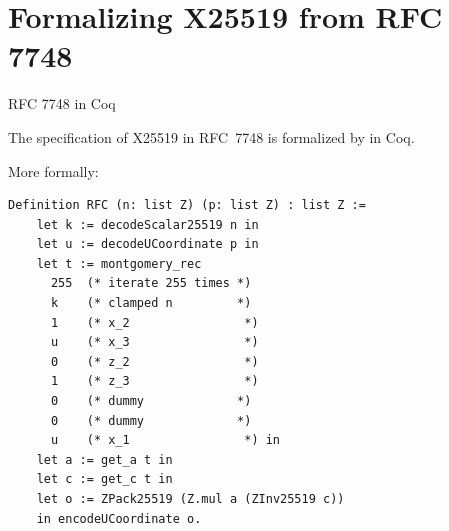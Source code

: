 \documentclass[8pt,aspectratio=169]{beamer}
\begin{document}


\section{Formalizing X25519 from RFC 7748}

%
%
\begin{frame}[fragile]{RFC 7748 in Coq}
	\begin{informaltheorem}
		The specification of X25519 in RFC~7748 is formalized by  in Coq.
	\end{informaltheorem}

	More formally:
	\begin{center}
		\begin{lstlisting}[language=Coq]
  Definition RFC (n: list Z) (p: list Z) : list Z :=
    let k := decodeScalar25519 n in
    let u := decodeUCoordinate p in
    let t := montgomery_rec
      255  (* iterate 255 times *)
      k    (* clamped n         *)
      1    (* x_2                *)
      u    (* x_3                *)
      0    (* z_2                *)
      1    (* z_3                *)
      0    (* dummy             *)
      0    (* dummy             *)
      u    (* x_1                *) in
    let a := get_a t in
    let c := get_c t in
    let o := ZPack25519 (Z.mul a (ZInv25519 c))
    in encodeUCoordinate o.
  \end{lstlisting}
	\end{center}
\end{frame}
\end{document}
